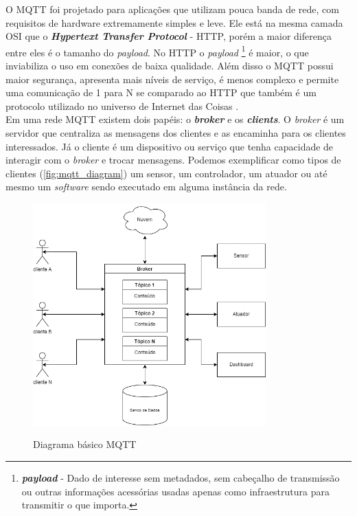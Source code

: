 O MQTT foi projetado para aplicações que utilizam pouca banda de rede, com requisitos de hardware extremamente simples e leve. Ele está na mesma camada OSI que o \textbf{\textit{Hypertext Transfer Protocol}} - HTTP, porém a maior diferença entre eles é o tamanho do \textit{payload}. No HTTP o \textit{payload} \footnote{\textit{\textbf{payload}} - Dado de interesse sem metadados, sem cabeçalho de transmissão ou outras informações acessórias usadas apenas como infraestrutura para transmitir o que importa.} é maior, o que inviabiliza o uso em conexões de baixa qualidade. Além disso o MQTT possui maior segurança, apresenta mais níveis de serviço, é menos complexo e permite uma comunicação de 1 para N se comparado ao HTTP que também é um protocolo utilizado no universo de Internet das Coisas \cite{UFRJ}.
\\
Em uma rede MQTT existem dois papéis: o \textit{\textbf{broker}} e os \textit{\textbf{clients}}. O \textit{broker} é um servidor que centraliza as mensagens dos clientes e as encaminha para os clientes interessados. Já o cliente é um dispositivo ou serviço que tenha capacidade de interagir com o \textit{broker} e trocar mensagens. Podemos exemplificar como tipos de clientes (\autoref{fig:mqtt_diagram}) um sensor, um controlador, um atuador ou até mesmo um \textit{software} sendo executado em alguma instância da rede.

\begin{figure}[H]
	\centering
	\caption{Diagrama básico MQTT}
	\includegraphics[width=0.8\textwidth]{figuras/mqtt.drawio.png}
	\label{fig:mqtt_diagram}
\end{figure}

